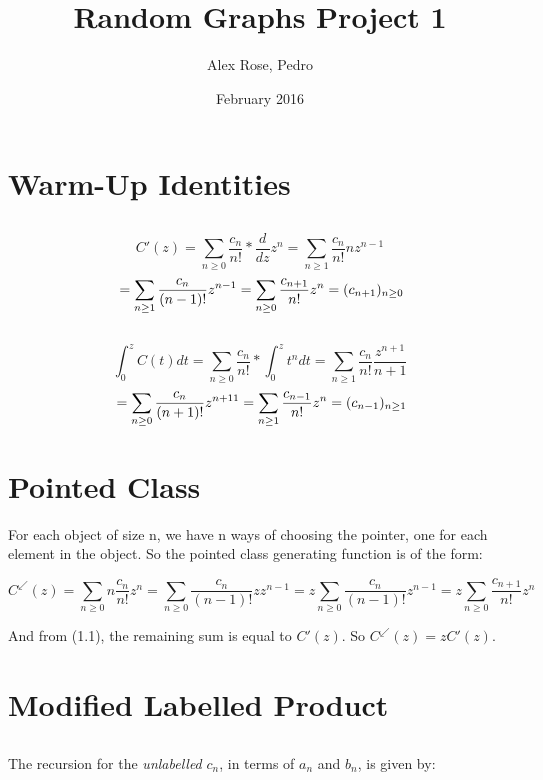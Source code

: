 \documentclass{article}
\title{Random Graphs Project 1}
\author{Alex Rose, Pedro}
\date{February 2016}
\begin{document}
\maketitle

\section{Warm-Up Identities}

\subsection{}
$$ C'(z) =\sum_{n \ge 0} \frac{c_n}{n!} * \frac{d}{dz} z^n = \sum_{n \ge 1} \frac{c_n}{n!}nz^{n-1}$$ 
$$\newline = \sum_{n \ge 1} \frac{c_n}{(n-1)!}z^{n-1} = \sum_{n \ge 0} \frac{c_{n+1}}{n!}z^{n} = (c_{n+1})_{n \ge 0} $$

\subsection{}
$$ \int_{0}^{z} C(t) dt  =\sum_{n \ge 0} \frac{c_n}{n!} * \int_{0}^{z} t^n dt = \sum_{n \ge 1} \frac{c_n}{n!} \frac{z^{n+1}}{n+1}$$ 
$$\newline = \sum_{n \ge 0} \frac{c_n}{(n+1)!}z^{n+11} = \sum_{n \ge 1} \frac{c_{n-1}}{n!}z^{n} = (c_{n-1})_{n \ge 1} $$ 

\section{Pointed Class}
For each object of size n, we have n ways of choosing the pointer, one for each element in the object. So the pointed class generating function is of the form:

$$C^\swarrow(z) = \sum_{n \ge 0} n\frac{c_n}{n!}z^n = \sum_{n \ge 0} \frac{c_n}{(n-1)!}zz^{n-1} = z\sum_{n \ge 0} \frac{c_n}{(n-1)!}z^{n-1} = z\sum_{n \ge 0} \frac{c_{n+1}}{n!}z^{n}$$

And from (1.1), the remaining sum is equal to $C'(z)$. So $C^\swarrow(z) = zC'(z)$.

\newpage

\section{Modified Labelled Product}

\subsection{}
The recursion for the \textit{unlabelled} $c_n$, in terms of $a_n$ and $b_n$, is given by:
\end{document}
